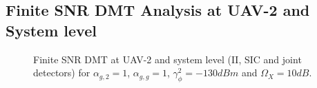 \subsection{Finite SNR DMT Analysis at UAV-2 and System level}

\begin{figure}[]
\centering
{}
\hfil
{}
\caption{Finite SNR DMT at UAV-2 and system level (II, SIC and joint detectors) for $\alpha_{g,2}=1$, $\alpha_{g,g}=1$, $\gamma_{\phi}^2=-130dBm$ and $\Omega_X=10dB$.}
\label{fig:JD_HBD_UCS_var_jd}
\end{figure}


